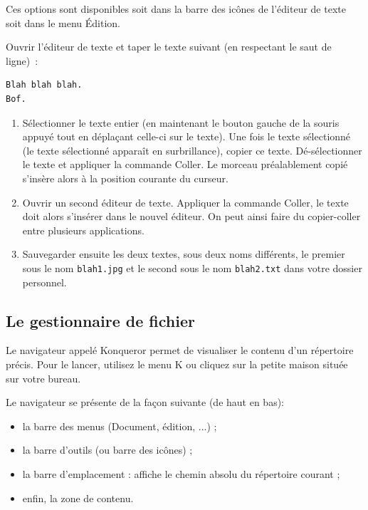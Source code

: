 \documentclass[12pt,a4paper]{article}
\begin{document}
Ces options sont disponibles soit dans la barre des icônes de
l'éditeur de texte soit dans le menu Édition.

Ouvrir l'éditeur de texte et taper le texte suivant (en respectant le
saut de ligne)~:

\begin{verbatim}
Blah blah blah.
Bof.
\end{verbatim}

\begin{enumerate}
\item Sélectionner le texte entier (en maintenant le bouton
  gauche de la souris appuyé tout en déplaçant celle-ci sur le
  texte). Une fois le texte sélectionné (le texte sélectionné apparaît
  en surbrillance), copier ce texte. Dé-sélectionner le texte et
  appliquer la commande Coller. Le morceau préalablement copié
  s'insère alors à la position courante du curseur.

\item Ouvrir un second éditeur de texte. Appliquer la commande Coller,
  le texte doit alors s'insérer dans le nouvel éditeur. On peut ainsi
  faire du copier-coller entre plusieurs applications.

\item Sauvegarder ensuite les deux textes, sous deux noms différents,
  le premier sous le nom {\tt blah1.jpg} et le second sous le nom
  {\tt blah2.txt} dans votre dossier personnel.
\end{enumerate}



\subsection{Le gestionnaire de fichier}
Le navigateur appelé Konqueror permet de visualiser le contenu d'un
répertoire précis. Pour le lancer, utilisez le menu K ou cliquez sur
la petite maison située sur votre bureau. 

Le navigateur se présente de la façon suivante (de haut en bas):
\begin{itemize}
\item la barre des menus (Document, édition, ...) ;
\item la barre d'outils (ou barre des icônes) ;
\item la barre d'emplacement : affiche le chemin absolu du répertoire
  courant ;
\item enfin, la zone de contenu.
\end{itemize}
\end{document}
